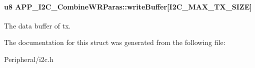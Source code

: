 \paragraph[{\texorpdfstring{write\+Buffer}{writeBuffer}}]{\setlength{\rightskip}{0pt plus 5cm}u8 A\+P\+P\+\_\+\+I2\+C\+\_\+\+Combine\+W\+R\+Paras\+::write\+Buffer\mbox{[}{\bf I2\+C\+\_\+\+M\+A\+X\+\_\+\+T\+X\+\_\+\+S\+I\+ZE}\mbox{]}}\hypertarget{struct_a_p_p___i2_c___combine_w_r_paras_a016f5b3f5ca9cdc868d40e627c48bb7b}{}\label{struct_a_p_p___i2_c___combine_w_r_paras_a016f5b3f5ca9cdc868d40e627c48bb7b}
The data buffer of tx. 

The documentation for this struct was generated from the following file\+:\begin{DoxyCompactItemize}
\item 
Peripheral/i2c.\+h\end{DoxyCompactItemize}
